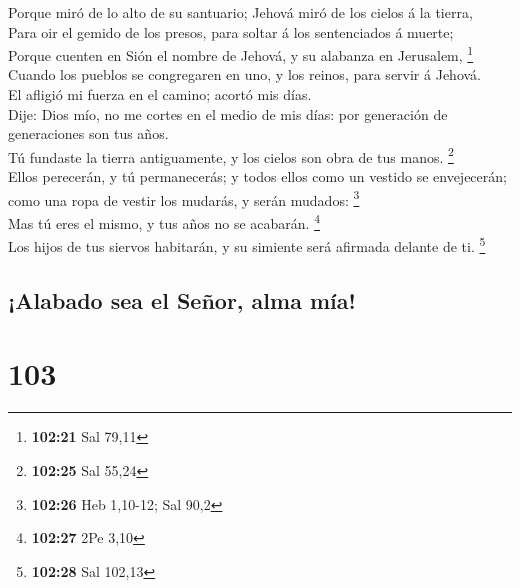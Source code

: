  Porque miró de lo alto de su santuario; Jehová miró de los
cielos á la tierra,\\
 Para oir el gemido de los presos, para soltar á los
sentenciados á muerte;\\
 Porque cuenten en Sión el nombre de Jehová, y su alabanza
en Jerusalem, \footnote{\textbf{102:21} Sal 79,11}\\
 Cuando los pueblos se congregaren en uno, y los reinos,
para servir á Jehová.\\
 El afligió mi fuerza en el camino; acortó mis días.\\
 Dije: Dios mío, no me cortes en el medio de mis días: por
generación de generaciones son tus años.\\
 Tú fundaste la tierra antiguamente, y los cielos son obra
de tus manos. \footnote{\textbf{102:25} Sal 55,24}\\
 Ellos perecerán, y tú permanecerás; y todos ellos como un
vestido se envejecerán; como una ropa de vestir los mudarás, y serán
mudados: \footnote{\textbf{102:26} Heb 1,10-12; Sal 90,2}\\
 Mas tú eres el mismo, y tus años no se acabarán.
\footnote{\textbf{102:27} 2Pe 3,10}\\
 Los hijos de tus siervos habitarán, y su simiente será
afirmada delante de ti. \footnote{\textbf{102:28} Sal 102,13}

\hypertarget{alabado-sea-el-seuxf1or-alma-muxeda}{%
\subsection{¡Alabado sea el Señor, alma
mía!}\label{alabado-sea-el-seuxf1or-alma-muxeda}}

\hypertarget{section-102}{%
\section{103}\label{section-102}}

